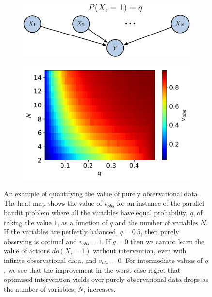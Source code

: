 \documentclass[11pt,a4paper,twoside]{report}
\theoremstyle{plain}
\theoremstyle{definition}
\begin{document}
\begin{figure}
	\centering
	 \begin{subfigure}[t]{0.8\textwidth}
	 \centering
	 \includegraphics{parallel_bandit2-crop}
	 \end{subfigure}
     \begin{subfigure}[t]{0.8\textwidth} 
     \centering  
	\includegraphics{value_of_observation}
	\end{subfigure}
	\label{fig:value_of_observation}
	\caption{An example of quantifying the value of purely observational data. The heat map shows the value of $v_{obs}$ for an instance of the parallel bandit problem where all the variables have equal probability, $q$, of taking the value $1$, as a function of $q$ and the number of variables $N$. If the variables are perfectly balanced, $q=0.5$, then purely observing is optimal and $v_{obs}=1$. If $q=0$ then we cannot learn the value of actions $do(X_i=1)$ without intervention, even with infinite observational data, and $v_{obs}=0$. For intermediate values of $q$, we see that the improvement in the worst case regret that optimised intervention yields over purely observational data drops as the number of variables, $N$, increases.}
\end{figure}
\end{document}
